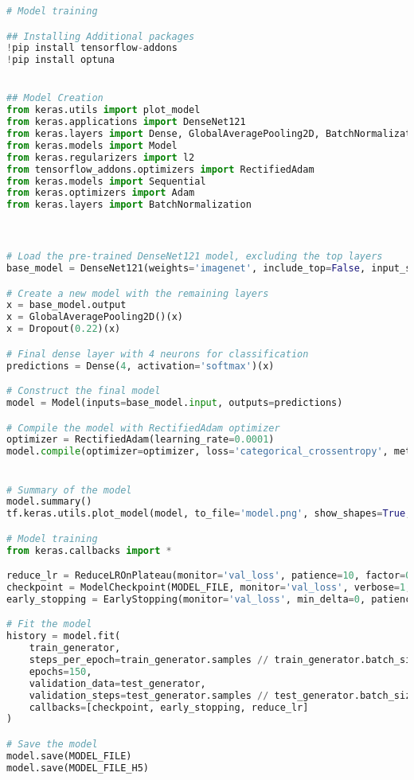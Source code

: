 \begin{lstlisting}[language=Python]
# Model training

## Installing Additional packages
!pip install tensorflow-addons
!pip install optuna


## Model Creation
from keras.utils import plot_model
from keras.applications import DenseNet121
from keras.layers import Dense, GlobalAveragePooling2D, BatchNormalization, Dropout
from keras.models import Model
from keras.regularizers import l2
from tensorflow_addons.optimizers import RectifiedAdam
from keras.models import Sequential
from keras.optimizers import Adam
from keras.layers import BatchNormalization



# Load the pre-trained DenseNet121 model, excluding the top layers
base_model = DenseNet121(weights='imagenet', include_top=False, input_shape=(224,224,3))

# Create a new model with the remaining layers
x = base_model.output
x = GlobalAveragePooling2D()(x)
x = Dropout(0.22)(x)

# Final dense layer with 4 neurons for classification
predictions = Dense(4, activation='softmax')(x)

# Construct the final model
model = Model(inputs=base_model.input, outputs=predictions)

# Compile the model with RectifiedAdam optimizer
optimizer = RectifiedAdam(learning_rate=0.0001)
model.compile(optimizer=optimizer, loss='categorical_crossentropy', metrics=['accuracy'])


# Summary of the model
model.summary()
tf.keras.utils.plot_model(model, to_file='model.png', show_shapes=True, show_layer_names=True)

# Model training
from keras.callbacks import *

reduce_lr = ReduceLROnPlateau(monitor='val_loss', patience=10, factor=0.3, min_lr=1e-6)
checkpoint = ModelCheckpoint(MODEL_FILE, monitor='val_loss', verbose=1, save_best_only=True)
early_stopping = EarlyStopping(monitor='val_loss', min_delta=0, patience=20, verbose=1, mode='auto')

# Fit the model
history = model.fit(
    train_generator,
    steps_per_epoch=train_generator.samples // train_generator.batch_size,
    epochs=150,
    validation_data=test_generator,
    validation_steps=test_generator.samples // test_generator.batch_size,
    callbacks=[checkpoint, early_stopping, reduce_lr]
)

# Save the model
model.save(MODEL_FILE)
model.save(MODEL_FILE_H5)


\end{lstlisting}
